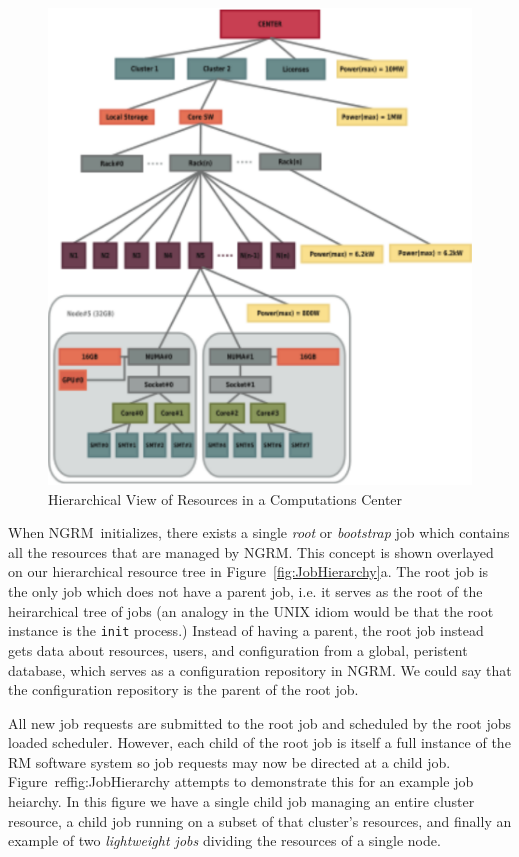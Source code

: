 \documentclass{article}
\newcommand{\ngrm}{NGRM}
\begin{document}
\begin{figure}
\centering
\includegraphics[scale=0.75]{../fig/resource_hierarchy.eps}
\caption{Hierarchical View of Resources in a Computations Center}
\label{fig:ResHierarchy}
\end{figure}

When \ngrm\ initializes, there exists a single {\em root} or {\em
bootstrap} job which contains all the resources that are managed by
\ngrm. This concept is shown overlayed on our hierarchical resource
tree in Figure~\ref{fig:JobHierarchy}a. The root job is the only job
which does not have a parent job, i.e. it serves as the root of
the heirarchical tree of jobs (an analogy in the UNIX idiom would
be that the root instance is the {\tt init} process.) Instead of
having a parent, the root job instead gets data about resources,
users, and configuration from a global, peristent database, which
serves as a configuration repository in \ngrm. We could say that
the configuration repository is the parent of the root job.

All new job requests are submitted to the root job and scheduled
by the root jobs loaded scheduler. However, each child of the
root job is itself a full instance of the RM software system
so job requests may now be directed at a child job.
Figure~ref{fig:JobHierarchy} attempts to demonstrate this for
an example job heiarchy. In this figure we have a single child
job managing an entire cluster resource, a child job running
on a subset of that cluster's resources, and finally an example
of two {\em lightweight jobs} dividing the resources of a
single node.
\end{document}
